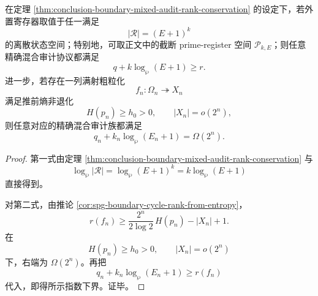 \begin{corollary}[查询—寄存预算的指数守恒律]\label{cor:conclusion-boundary-query-register-budget-exponential-law}
在定理 \ref{thm:conclusion-boundary-mixed-audit-rank-conservation} 的设定下，若外置寄存器取值于任一满足
\[
|\mathcal R|=(E+1)^k
\]
的离散状态空间；特别地，可取正文中的截断 prime-register 空间 \(\mathcal P_{k,E}\)；则任意精确混合审计协议都满足
\[
q+k\log_\wp(E+1)\ge r.
\]
进一步，若存在一列满射粗粒化
\[
f_n:\Omega_n\twoheadrightarrow X_n
\]
满足推前熵非退化
\[
H(p_n)\ge h_0>0,
\qquad
|X_n|=o(2^n),
\]
则任意对应的精确混合审计族都满足
\[
q_n+k_n\log_\wp(E_n+1)=\Omega(2^n).
\]
\end{corollary}
\begin{proof}
第一式由定理 \ref{thm:conclusion-boundary-mixed-audit-rank-conservation} 与
\[
\log_\wp |\mathcal R|=\log_\wp (E+1)^k=k\log_\wp(E+1)
\]
直接得到。

对第二式，由推论 \ref{cor:spg-boundary-cycle-rank-from-entropy}，
\[
r(f_n)\ge \frac{2^n}{2\log 2}\,H(p_n)-|X_n|+1.
\]
在
\[
H(p_n)\ge h_0>0,
\qquad
|X_n|=o(2^n)
\]
下，右端为 \(\Omega(2^n)\)。再把
\[
q_n+k_n\log_\wp(E_n+1)\ge r(f_n)
\]
代入，即得所示指数下界。证毕。
\end{proof}

